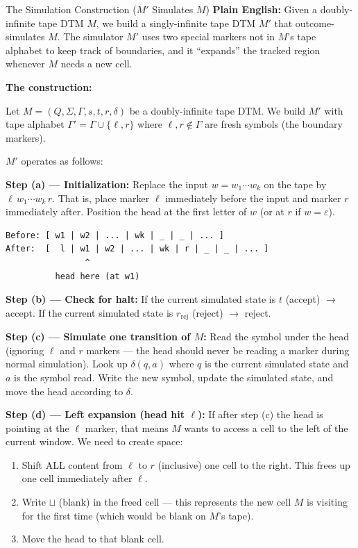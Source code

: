 \begin{definitionbox}{{The Simulation Construction ($M'$ Simulates $M$)}}
\textbf{Plain English:}
Given a doubly-infinite tape DTM $M$, we build a singly-infinite tape DTM
$M'$ that outcome-simulates $M$. The simulator $M'$ uses two special markers
not in $M$'s tape alphabet to keep track of boundaries, and it ``expands'' the
tracked region whenever $M$ needs a new cell.

\textbf{The construction:}

Let $M = (Q, \Sigma, \Gamma, s, t, r, \delta)$ be a doubly-infinite tape DTM.
We build $M'$ with tape alphabet
$\Gamma' = \Gamma \cup \{\ell, r\}$ where $\ell, r \notin \Gamma$ are fresh
symbols (the boundary markers).

$M'$ operates as follows:

\textbf{Step (a) --- Initialization:}
Replace the input $w = w_1 \cdots w_k$ on the tape by
$\ell\, w_1 \cdots w_k\, r$. That is, place marker $\ell$ immediately before
the input and marker $r$ immediately after. Position the head at the first
letter of $w$ (or at $r$ if $w = \varepsilon$).

\begin{lstlisting}
Before: [ w1 | w2 | ... | wk | _ | _ | ... ]
After:  [  l | w1 | w2 | ... | wk | r | _ | _ | ... ]
                ^
          head here (at w1)
\end{lstlisting}

\textbf{Step (b) --- Check for halt:}
If the current simulated state is $t$ (accept) $\to$ accept.
If the current simulated state is $r_{\text{rej}}$ (reject) $\to$ reject.

\textbf{Step (c) --- Simulate one transition of $M$:}
Read the symbol under the head (ignoring $\ell$ and $r$ markers --- the head
should never be reading a marker during normal simulation). Look up
$\delta(q, a)$ where $q$ is the current simulated state and $a$ is the symbol
read. Write the new symbol, update the simulated state, and move the head
according to $\delta$.

\textbf{Step (d) --- Left expansion (head hit $\ell$):}
If after step (c) the head is pointing at the $\ell$ marker, that means $M$
wants to access a cell to the left of the current window. We need to create
space:
\begin{enumerate}[nosep]
\item Shift ALL content from $\ell$ to $r$ (inclusive) one cell to the right.
  This frees up one cell immediately after $\ell$.
\item Write $\sqcup$ (blank) in the freed cell --- this represents the new
  cell $M$ is visiting for the first time (which would be blank on $M$'s tape).
\item Move the head to that blank cell.
\end{enumerate}


\end{definitionbox}
